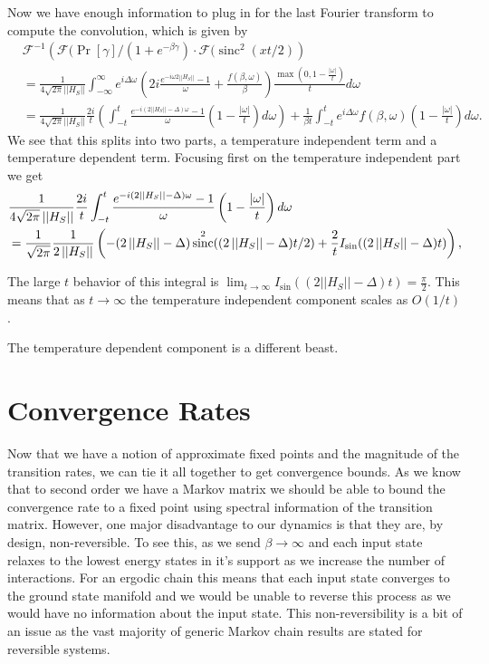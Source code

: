 \documentclass[
 amsmath,amssymb,
 aps,
onecolumn, 
nofootinbib]{revtex4-2}
\newcommand{\norm}[1]{\left|\left| #1 \right|\right|}
\DeclareMathOperator{\sinc}{sinc}
\begin{document}
Now we have enough information to plug in for the last Fourier transform to compute the convolution, which is given by
\begin{align}
    &\mathcal{F}^{-1} \left(\mathcal{F}(\Pr[\gamma]/(1 + e^{-\beta \gamma} ) \cdot \mathcal{F}(\sinc^2(x t /2) \right) \\
    &= \frac{1}{4 \sqrt{2 \pi} \norm{H_S} } \int_{-\infty}^{\infty} e^{i \Delta \omega} \left(2 i \frac{e^{-i \omega 2 \norm{H_S}} - 1}{\omega} + \frac{f(\beta, \omega)}{\beta} \right) \frac{\max\left(0, 1 - \frac{|\omega|}{t} \right)}{t} d\omega \\
    &= \frac{1}{4 \sqrt{2 \pi} \norm{H_S}} \frac{2i}{t} \left(\int_{-t}^t \frac{e^{-i (2 \norm{H_S} - \Delta)\omega} - 1}{\omega} \left(1 - \frac{|\omega|}{t}\right) d\omega \right) + \frac{1}{\beta t} \int_{-t}^t e^{i \Delta \omega} f(\beta, \omega) \left(1 - \frac{|\omega|}{t}\right) d\omega.
\end{align}
We see that this splits into two parts, a temperature independent term and a temperature dependent term. Focusing first on the temperature independent part we get
\begin{align}
    &\frac{1}{4 \sqrt{2 \pi} \norm{H_S}} \frac{2i}{t} \int_{-t}^{t} \frac{e^{-i (2 \norm{H_S} - \Delta) \omega} - 1}{\omega} \left(1 - \frac{|\omega|}{t}\right) d\omega \\
    &= \frac{1}{\sqrt{2\pi}} \frac{1}{2 \norm{H_S}} \left(-(2 \norm{H_S} - \Delta) \sinc^2((2 \norm{H_S} - \Delta) t/2) + \frac{2}{t} I_{\rm sin}((2 \norm{H_S} - \Delta) t) \right),
\end{align}

The large $t$ behavior of this integral is $\lim_{t \to \infty} I_{\sin}((2 \norm{H_S} - \Delta)t) = \frac{\pi}{2}$. This means that as $t \to \infty$ the temperature independent component scales as $O(1/t)$. 

The temperature dependent component is a different beast. 

\section{Convergence Rates}
Now that we have a notion of approximate fixed points and the magnitude of the transition rates, we can tie it all together to get convergence bounds. As we know that to second order we have a Markov matrix we should be able to bound the convergence rate to a fixed point using spectral information of the transition matrix. However, one major disadvantage to our dynamics is that they are, by design, non-reversible. To see this, as we send $\beta \to \infty$ and each input state relaxes to the lowest energy states in it's support as we increase the number of interactions. For an ergodic chain this means that each input state converges to the ground state manifold and we would be unable to reverse this process as we would have no information about the input state. This non-reversibility is a bit of an issue as the vast majority of generic Markov chain results are stated for reversible systems.
\end{document}
